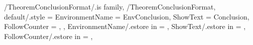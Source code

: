 \newcommand{\InsertAcknowledgment}[1]
{%
  \InsertTheoremContent[\empty]{%
    \GetTheoremAcknowledgmentFormatEnvironmentName}{#1}%
} %

\newcommand{\InitTheoremAcknowledgmentFormat}
{%
  \ifthenelse{\equal{\GetTheoremAcknowledgmentFormatFollowCounter}{\empty}}%
  {%
    \newtheorem*{%
      \GetTheoremAcknowledgmentFormatEnvironmentName}{%
      \GetTheoremAcknowledgmentFormatShowText}
  }%
  {%
    \newtheorem{%
      \GetTheoremAcknowledgmentFormatEnvironmentName}{%
      \GetTheoremAcknowledgmentFormatShowText}[%
      \GetTheoremAcknowledgmentFormatFollowCounter]%
  }%
} %


\pgfkeys
{
  /TheoremConclusionFormat/.is family, /TheoremConclusionFormat,
  default/.style =
  {
    EnvironmentName = {EnvConclusion},
    ShowText = {Conclusion},
    FollowCounter = \empty,
  },
  EnvironmentName/.estore in = \GetTheoremConclusionFormatEnvironmentName,
  ShowText/.estore in = \GetTheoremConclusionFormatShowText,
  FollowCounter/.estore in = \GetTheoremConclusionFormatFollowCounter,
} %

\newcommand{\InsertConclusion}[1]
{%
  \InsertTheoremContent[\empty]{%
    \GetTheoremConclusionFormatEnvironmentName}{#1}%
} %

\newcommand{\InitTheoremConclusionFormat}
{%
  \ifthenelse{\equal{\GetTheoremConclusionFormatFollowCounter}{\empty}}%
  {%
    \newtheorem*{%
      \GetTheoremConclusionFormatEnvironmentName}{%
      \GetTheoremConclusionFormatShowText}
  }%
  {%
    \newtheorem{%
      \GetTheoremConclusionFormatEnvironmentName}{%
      \GetTheoremConclusionFormatShowText}[%
      \GetTheoremConclusionFormatFollowCounter]%
  }%
} %


\newcommand{\InitTheoremFormats}
{%
  \InitTheoremDefinitionFormat%
  \InitTheoremConditionFormat%
  \InitTheoremProblemFormat%
  \InitTheoremExampleFormat%
  \InitTheoremTheoremFormat%
  \InitTheoremLemmaFormat%
  \InitTheoremCorollarieFormat%
  \InitTheoremPropositionFormat%
  \InitTheoremConjectureFormat%
  \InitTheoremProofFormat%
  \InitTheoremNoteFormat%
  \InitTheoremAnnotationFormat%
  \InitTheoremClaimFormat%
  \InitTheoremCaseFormat%
  \InitTheoremAcknowledgmentFormat%
  \InitTheoremConclusionFormat%
} %

